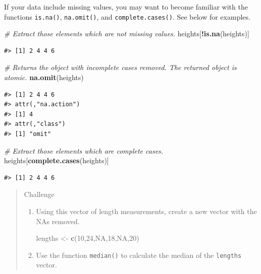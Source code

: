 \documentclass[]{book}
\newenvironment{Shaded}{\begin{snugshade}}{\end{snugshade}}
\newcommand{\KeywordTok}[1]{\textcolor[rgb]{0.13,0.29,0.53}{\textbf{#1}}}
\newcommand{\DecValTok}[1]{\textcolor[rgb]{0.00,0.00,0.81}{#1}}
\newcommand{\StringTok}[1]{\textcolor[rgb]{0.31,0.60,0.02}{#1}}
\newcommand{\CommentTok}[1]{\textcolor[rgb]{0.56,0.35,0.01}{\textit{#1}}}
\newcommand{\OtherTok}[1]{\textcolor[rgb]{0.56,0.35,0.01}{#1}}
\newcommand{\OperatorTok}[1]{\textcolor[rgb]{0.81,0.36,0.00}{\textbf{#1}}}
\newcommand{\NormalTok}[1]{#1}
\theoremstyle{definition}
\theoremstyle{definition}
\theoremstyle{remark}
\begin{document}
If your data include missing values, you may want to become familiar
with the functions \texttt{is.na()}, \texttt{na.omit()}, and
\texttt{complete.cases()}. See below for examples.

\begin{Shaded}
\begin{Highlighting}[]
\CommentTok{# Extract those elements which are not missing values.}
\NormalTok{heights[}\OperatorTok{!}\KeywordTok{is.na}\NormalTok{(heights)]}
\end{Highlighting}
\end{Shaded}

\begin{verbatim}
#> [1] 2 4 4 6
\end{verbatim}

\begin{Shaded}
\begin{Highlighting}[]
\CommentTok{# Returns the object with incomplete cases removed. The returned object is atomic.}
\KeywordTok{na.omit}\NormalTok{(heights)}
\end{Highlighting}
\end{Shaded}

\begin{verbatim}
#> [1] 2 4 4 6
#> attr(,"na.action")
#> [1] 4
#> attr(,"class")
#> [1] "omit"
\end{verbatim}

\begin{Shaded}
\begin{Highlighting}[]
\CommentTok{# Extract those elements which are complete cases.}
\NormalTok{heights[}\KeywordTok{complete.cases}\NormalTok{(heights)]}
\end{Highlighting}
\end{Shaded}

\begin{verbatim}
#> [1] 2 4 4 6
\end{verbatim}

\begin{quote}
Challenge

\begin{enumerate}
\def\labelenumi{\arabic{enumi}.}
\item
  Using this vector of length measurements, create a new vector with the
  NAs removed.

\begin{Shaded}
\begin{Highlighting}[]
\NormalTok{lengths <-}\StringTok{ }\KeywordTok{c}\NormalTok{(}\DecValTok{10}\NormalTok{,}\DecValTok{24}\NormalTok{,}\OtherTok{NA}\NormalTok{,}\DecValTok{18}\NormalTok{,}\OtherTok{NA}\NormalTok{,}\DecValTok{20}\NormalTok{)}
\end{Highlighting}
\end{Shaded}
\item
  Use the function \texttt{median()} to calculate the median of the
  \texttt{lengths} vector.
\end{enumerate}
\end{quote}
\end{document}
